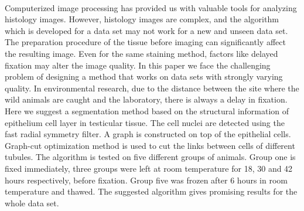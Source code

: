 {{{\begin{enumerate}
\\ \aabstract
Computerized image processing has provided us with valuable tools for analyzing histology images. However, histology images are complex, and the algorithm which is developed for a data set may not work for a new and unseen data set. The preparation procedure of the tissue before imaging can significantly affect the resulting image. Even for the same staining method, factors like delayed fixation may alter the image quality. In this paper we face the challenging problem of designing a method that works on data sets with strongly varying quality. In environmental research, due to the distance between the site where the wild animals are caught and the laboratory, there is always a delay in fixation. Here we suggest a segmentation method based on the structural information of epithelium cell layer in testicular tissue. The cell nuclei are detected using the fast radial symmetry filter. A graph is constructed on top of the epithelial cells. Graph-cut optimization method is used to cut the links between cells of different tubules. The algorithm is tested on five different groups of animals. Group one is fixed immediately, three groups were left at room temperature for 18, 30 and 42 hours respectively, before fixation. Group five was frozen after 6 hours in room temperature and thawed. The suggested algorithm gives promising results for the whole data set. 
 


\end{enumerate}}}}
